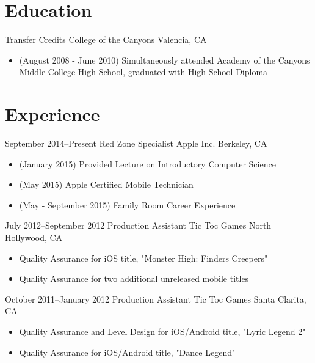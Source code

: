 \documentclass[11pt,a4paper,sans]{moderncv}        %
\begin{document}
\makecvtitle

\section{Education}
 {Transfer Credits}
{College of the Canyons}    {Valencia, CA}
{}
{
  \begin{itemize}
  \item (August 2008 - June 2010) Simultaneously attended Academy of the Canyons Middle College High School, graduated with High School Diploma
  \end{itemize}
}

\section{Experience}		%
\cventry
{September 2014--Present}	{Red Zone Specialist}
{Apple Inc.}	{Berkeley, CA}
{}
{
  \begin{itemize}
  \item (January 2015) Provided Lecture on Introductory Computer Science 
  \item (May 2015) Apple Certified Mobile Technician
  \item (May - September 2015) Family Room Career Experience
  \end{itemize}
}	%

\cventry
{July 2012--September 2012}	{Production Assistant}
{Tic Toc Games}	{North Hollywood, CA}
{}
{
  \begin{itemize}
  \item Quality Assurance for iOS title, "Monster High: Finders Creepers"
  \item Quality Assurance for two additional unreleased mobile titles
  \end{itemize}
}	%

\cventry
{October 2011--January 2012}	{Production Assistant}
{Tic Toc Games}	{Santa Clarita, CA}
{}
{
  \begin{itemize}
  \item Quality Assurance and Level Design for iOS/Android title, "Lyric Legend 2"
  \item Quality Assurance for iOS/Android title, "Dance Legend"
  \end{itemize}
}	%
\end{document}
